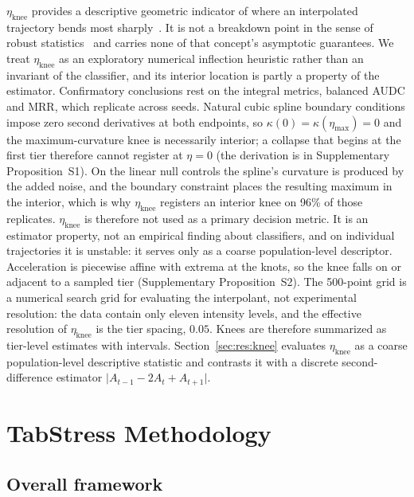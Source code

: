 \documentclass[pdflatex,sn-mathphys]{sn-jnl}
\theoremstyle{thmstyleone}
\theoremstyle{thmstyletwo}
\theoremstyle{thmstylethree}
\newcommand{\etamax}{\eta_{\max}}
\newcommand{\etaknee}{\eta_{\mathrm{knee}}}
\begin{document}
$\etaknee$ provides a descriptive geometric indicator of where an interpolated trajectory bends most sharply~\cite{satopaa2011finding,salvador2004determining}. It is not a breakdown point in the sense of robust statistics~\cite{donoho1983notion} and carries none of that concept's asymptotic guarantees. We treat $\etaknee$ as an exploratory numerical inflection heuristic rather than an invariant of the classifier, and its interior location is partly a property of the estimator. Confirmatory conclusions rest on the integral metrics, balanced AUDC and MRR, which replicate across seeds. Natural cubic spline boundary conditions impose zero second derivatives at both endpoints, so $\kappa(0)=\kappa(\etamax)=0$ and the maximum-curvature knee is necessarily interior; a collapse that begins at the first tier therefore cannot register at $\eta=0$ (the derivation is in Supplementary Proposition~S1). On the linear null controls the spline's curvature is produced by the added noise, and the boundary constraint places the resulting maximum in the interior, which is why $\etaknee$ registers an interior knee on 96\% of those replicates. $\etaknee$ is therefore not used as a primary decision metric. It is an estimator property, not an empirical finding about classifiers, and on individual trajectories it is unstable: it serves only as a coarse population-level descriptor. Acceleration is piecewise affine with extrema at the knots, so the knee falls on or adjacent to a sampled tier (Supplementary Proposition~S2). The 500-point grid is a numerical search grid for evaluating the interpolant, not experimental resolution: the data contain only eleven intensity levels, and the effective resolution of $\etaknee$ is the tier spacing, $0.05$. Knees are therefore summarized as tier-level estimates with intervals. Section~\ref{sec:res:knee} evaluates $\etaknee$ as a coarse population-level descriptive statistic and contrasts it with a discrete second-difference estimator $\lvert A_{t-1}-2A_t+A_{t+1}\rvert$.

\section{TabStress Methodology}\label{sec:method}

\subsection{Overall framework}\label{sec:method:framework}
\end{document}
